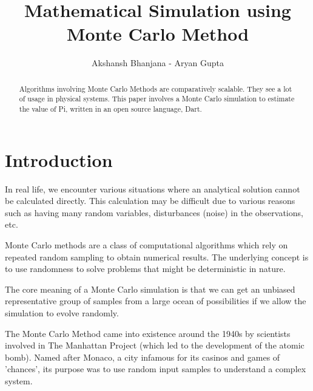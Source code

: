 \documentclass{resonance}
\begin{document}
	
	\title{Mathematical Simulation using Monte Carlo Method}
	\author{Akshansh Bhanjana - Aryan Gupta}
	
	\maketitle
	
	\begin{abstract}
		Algorithms involving Monte Carlo Methods are comparatively scalable. They see a lot of usage in physical systems. This paper involves a Monte Carlo simulation to estimate the value of Pi, written in an open source language, Dart.
	\end{abstract}
	
	
	
	\section{Introduction}
	In real life, we encounter various situations where an analytical solution cannot be calculated directly. This calculation may be difficult due to various reasons such as having many random variables, disturbances (noise) in the observations, etc.
	
	Monte Carlo methods are a class of computational algorithms which rely on repeated random sampling to obtain numerical results. The underlying concept is to use randomness to solve problems that might be deterministic in nature.
	
	The core meaning of a Monte Carlo simulation is that we can get an unbiased representative group of samples from a large ocean of possibilities if we allow the simulation to evolve randomly.
	
	The Monte Carlo Method came into existence around the 1940s by scientists involved in The Manhattan Project (which led to the development of the atomic bomb). Named after Monaco, a city infamous for its casinos and games of 'chances', its purpose was to use random input samples to understand a complex system. 
	
\end{document}
